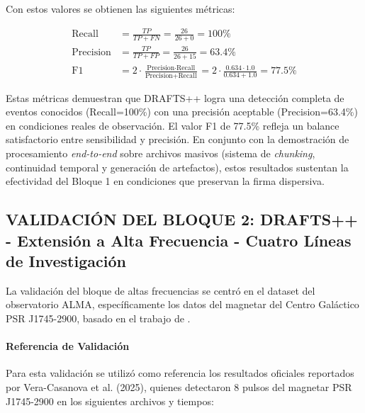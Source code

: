 Con estos valores se obtienen las siguientes métricas:

\begin{align}
\text{Recall} &= \frac{TP}{TP + FN} = \frac{26}{26 + 0} = 100\% \\
\text{Precision} &= \frac{TP}{TP + FP} = \frac{26}{26 + 15} = 63.4\% \\
\text{F1} &= 2 \cdot \frac{\text{Precision} \cdot \text{Recall}}{\text{Precision} + \text{Recall}} = 2 \cdot \frac{0.634 \cdot 1.0}{0.634 + 1.0} = 77.5\%
\end{align}

Estas métricas demuestran que DRAFTS++ logra una detección completa de eventos conocidos (Recall=100\%) con una precisión aceptable (Precision=63.4\%) en condiciones reales de observación. El valor F1 de 77.5\% refleja un balance satisfactorio entre sensibilidad y precisión. En conjunto con la demostración de procesamiento \emph{end-to-end} sobre archivos masivos (sistema de \textit{chunking}, continuidad temporal y generación de artefactos), estos resultados sustentan la efectividad del Bloque 1 en condiciones que preservan la firma dispersiva.

\subsection{VALIDACIÓN DEL BLOQUE 2: DRAFTS++ - Extensión a Alta Frecuencia - Cuatro Líneas de Investigación}

La validación del bloque de altas frecuencias se centró en el dataset del observatorio ALMA, específicamente los datos del magnetar del Centro Galáctico PSR J1745-2900, basado en el trabajo de \cite{veracasanova2025}.

\paragraph{Referencia de Validación}

Para esta validación se utilizó como referencia los resultados oficiales reportados por Vera-Casanova et al. (2025), quienes detectaron 8 pulsos del magnetar PSR J1745-2900 en los siguientes archivos y tiempos:

